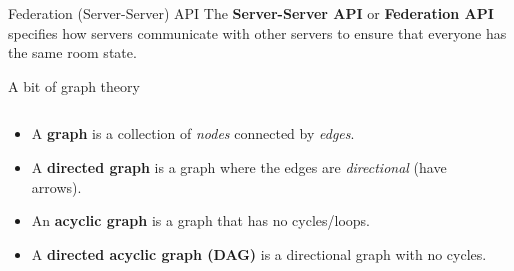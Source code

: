 \documentclass{acm}
\begin{document}
\begin{frame}{Federation (Server-Server) API}
    The \textbf{Server-Server API} or \textbf{Federation API} specifies how
    servers communicate with other servers to ensure that everyone has the same
    room state.
\end{frame}

\begin{frame}{A bit of graph theory}
    \begin{columns}
    \begin{column}{0.6\textwidth}
        \begin{itemize}[<+->]
            \item A \textbf{graph} is a collection of \textit{nodes} connected by
                \textit{edges}.
            \item A \textbf{directed graph} is a graph where the edges are
                \textit{directional} (have arrows).
            \item An \textbf{acyclic graph} is a graph that has no cycles/loops.
            \item A \textbf{directed acyclic graph (DAG)} is a directional graph
                with no cycles.
        \end{itemize}
    \end{column}%
    \begin{column}{0.4\textwidth} %
    \end{column}
    \end{columns}
\end{frame}
\end{document}
